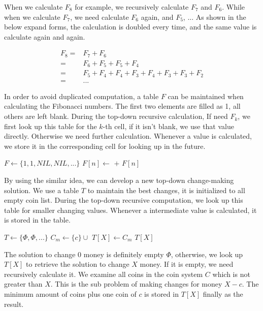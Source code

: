\documentclass[UTF8]{article}
\begin{document}
When we calculate $F_8$ for example, we recursively calculate $F_7$ and $F_6$.
While when we calculate $F_7$, we need calculate $F_6$ again, and $F_5$, ...
As shown in the below expand forms, the calculation is doubled every time,
and the same value is calculate again and again.

\[
\begin{array}{rl}
F_8 = & F_7 + F_6 \\
   = & F_6 + F_5 + F_5 + F_4 \\
   = & F_5 + F_4 + F_4 + F_3 + F_4 + F_3 + F_3 + F_2 \\
   = & ...
\end{array}
\]

In order to avoid duplicated computation, a table $F$ can be maintained
when calculating the Fibonacci numbers.
The first two elements are filled as 1, all others are left blank. During
the top-down recursive calculation, If need $F_k$, we first look up this
table for the $k$-th cell, if it isn't blank, we use that value directly.
Otherwise we need further calculation. Whenever a value is calculated,
we store it in the corresponding cell for looking up in the future.

\begin{algorithmic}[1]
\State $F \gets \{1, 1, NIL, NIL, ...\}$
    \State $F[n] \gets$  $+$ 
  \EndIf
  \State \Return $F[n]$
\EndFunction
\end{algorithmic}

By using the similar idea, we can develop a new top-down change-making
solution. We use a table $T$ to maintain the best changes, it is initialized
to all empty coin list. During the top-down recursive computation,
we look up this table for smaller changing values. Whenever a intermediate
value is calculated, it is stored in the table.

\begin{algorithmic}[1]
\State $T \gets \{\Phi, \Phi, ...\}$
        \State $C_m \gets \{c\} \cup$ 
          \State $T[X] \gets C_m$
        \EndIf
      \EndIf
    \EndFor
  \EndIf
  \State \Return $T[X]$
\EndFunction
\end{algorithmic}

The solution to change 0 money is definitely empty $\Phi$, otherwise, we look up
$T[X]$ to retrieve the solution to change $X$ money. If it is empty, we need
recursively calculate it. We examine all coins in the coin system $C$ which is
not greater than $X$. This is the sub problem of making changes for money $X-c$.
The minimum amount of coins plus one coin of $c$ is stored in $T[X]$ finally
as the result.
\end{document}
